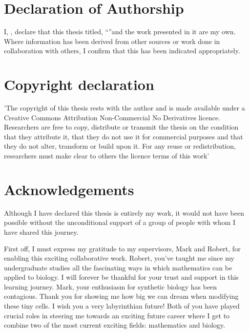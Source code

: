 \documentclass[
    11pt,
    oneside, %
    english,
    onehalfspacing, %
parskip, %
]{PhDDoctoralThesis}
\begin{document}
    \chapter*{Declaration of Authorship}
\addchaptertocentry{\authorshipname} %

    \noindent I, \authorname, declare that this thesis titled, \enquote{\ttitle}and the work presented in it are my own.
        Where information has been derived from other sources or work done in collaboration with others,
        I confirm that this has been indicated appropriately.
        
    \chapter*{Copyright declaration}
    \addchaptertocentry{\copyrightname} %

    'The copyright of this thesis rests with the author and is made available under a Creative
    Commons Attribution Non-Commercial No Derivatives licence. Researchers are free to copy,
    distribute or transmit the thesis on the condition that they attribute it, that they do not use
    it for commercial purposes and that they do not alter, transform or build upon it. For any
    reuse or redistribution, researchers must make clear to others the licence terms of this
    work'


   \chapter*{Acknowledgements}
       \addchaptertocentry{\acknowledgementname}
       Although I have declared this thesis is entirely my work, it would not have been possible without the unconditional support of a group of people with whom I have shared this journey.

       First off, I must express my gratitude to my supervisors, Mark and Robert, for enabling this exciting collaborative work.
       Robert, you've taught me since my undergraduate studies all the fascinating ways in which mathematics can be applied to biology.
       I will forever be thankful for your trust and support in this learning journey.
       Mark, your enthusiasm for synthetic biology has been contagious.
       Thank you for showing me how big we can dream when modifying these tiny cells.
       I wish you a very labyrinthian future!
       Both of you have played crucial roles in steering me towards an exciting future career where I get to combine two of the most current exciting fields: mathematics and biology.
\end{document}
